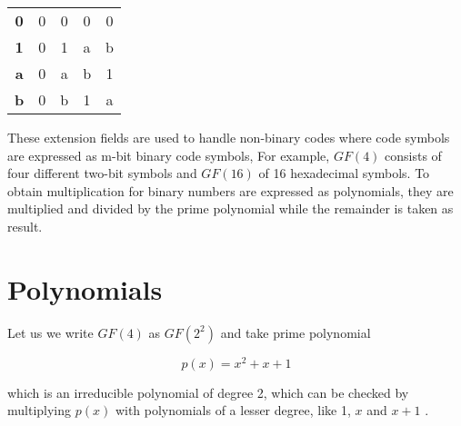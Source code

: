 \documentclass[../main.tex]{subfiles}
\begin{document}
\begin{table}[htp]
\begin{center}
{\begin{minipage}[t]{0.475\textwidth}
\begin{tabular}{c | c c c c}
                        \textbf{0}  & 0             & 0             & 0             & 0 \\
                        \textbf{1}  & 0             & 1             & a             & b \\
                        \textbf{a}  & 0             & a             & b             & 1 \\
                        \textbf{b}  & 0             & b             & 1             & a \\
                    \end{tabular}
                \end{minipage}
            }
        \end{center}
    \end{table}

    These extension fields are used to handle non-binary codes where code symbols are expressed as m-bit binary code symbols, For example, ${GF(4)}$ consists of four different two-bit symbols and ${GF(16)}$ of 16 hexadecimal symbols. To obtain multiplication for binary numbers are expressed as polynomials, they are multiplied and divided by the prime polynomial while the remainder is taken as result.


    \section{Polynomials}
    Let us we write ${GF(4)}$ as ${GF(2^2)}$ and take prime polynomial

    \begin{equation*}
        p(x) = x^2 + x + 1
    \end{equation*}

    \noindent
    which is an irreducible polynomial of degree 2, which can be checked by multiplying ${p(x)}$ with polynomials of a lesser degree, like 1, ${x}$ and ${x+1}$ \autocite{blahut1983theory}.
\end{document}
